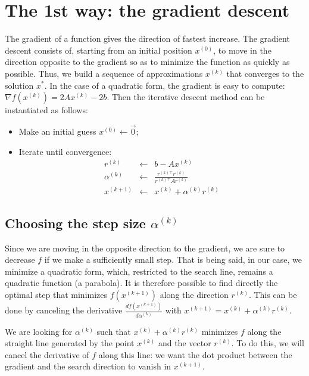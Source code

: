 \documentclass[notitlepage,oneside]{book}
\begin{document}
\newpage

\section{The 1st way: the gradient descent}
\label{chap5:sec:linalg:descente_gradient}

The gradient of a function gives the direction of fastest increase.
The gradient descent consists of, starting from an initial position $x^{(0)}$,
to move in the direction opposite to the gradient so as to minimize the function as quickly as possible.
Thus, we build a sequence of approximations $x^{(k)}$ that converges to the solution $x^*$.
In the case of a quadratic form, the gradient is easy to compute: $\nabla f(x^{(k)}) = 2Ax^{(k)} - 2b$.
Then the iterative descent method can be instantiated as follows:

\begin{framed}
\begin{itemize}
\setlength\parsep{0pt}
\setlength\itemsep{0pt}
\setlength{\parskip}{0pt}
\setlength{\topsep}{0pt}
\setlength{\partopsep}{0pt}
\item Make an initial guess $x^{(0)} \leftarrow \vec{0} $;
\item Iterate until convergence:
\begin{eqnarray*}
  r^{(k)} &\leftarrow& b -Ax^{(k)}\\
  \alpha^{(k)} &\leftarrow& \frac{r^{(k)\top}r^{(k)}}{r^{(k)\top}Ar^{(k)}}\\
  x^{(k+1)} &\leftarrow& x^{(k)}+\alpha^{(k)} r^{(k)}
\end{eqnarray*}
\end{itemize}
\end{framed}


\subsection{Choosing the step size $\alpha^{(k)}$}
Since we are moving in the opposite direction to the gradient, we are sure to decrease $f$ if we make a sufficiently small step.
That is being said, in our case, we minimize a quadratic form, which, restricted to the search line, remains a quadratic function (a parabola).
It is therefore possible to find directly the optimal step that minimizes $f(x^{(k+1)})$ along the direction $r^{(k)}$.
This can be done by canceling the derivative $\frac{df\left(x^{(k+1)}\right)}{d\alpha^{(k)}}$ with $x^{(k+1)}=x^{(k)}+\alpha^{(k)} r^{(k)}$.

We are looking for $\alpha^{(k)}$ such that $x^{(k)}+\alpha^{(k)} r^{(k)}$ minimizes $f$ along the straight line
generated by the point $x^{(k)}$ and the vector $r^{(k)}$.
To do this, we will cancel the derivative of $f$ along this line:
we want the dot product between the gradient and the search direction to vanish in $x^{(k+1)}$.
\end{document}
